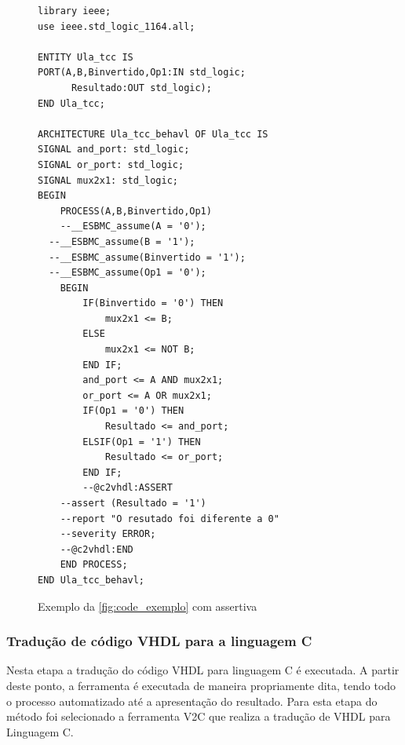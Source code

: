 \begin{figure}[H]
\caption{\label{fig:code_assertivas} Exemplo da \autoref{fig:code_exemplo} com assertiva}
	\begin{center}
    \begin{minipage}{0.7\textwidth}
    \begin{lstlisting}       
library ieee;
use ieee.std_logic_1164.all;

ENTITY Ula_tcc IS
PORT(A,B,Binvertido,Op1:IN std_logic;
	  Resultado:OUT std_logic);
END Ula_tcc;

ARCHITECTURE Ula_tcc_behavl OF Ula_tcc IS
SIGNAL and_port: std_logic;
SIGNAL or_port: std_logic;
SIGNAL mux2x1: std_logic;
BEGIN
	PROCESS(A,B,Binvertido,Op1)
	--__ESBMC_assume(A = '0');
  --__ESBMC_assume(B = '1');
  --__ESBMC_assume(Binvertido = '1');
  --__ESBMC_assume(Op1 = '0');
	BEGIN
		IF(Binvertido = '0') THEN
			mux2x1 <= B;
		ELSE
			mux2x1 <= NOT B;
		END IF;
		and_port <= A AND mux2x1;
		or_port <= A OR mux2x1;
		IF(Op1 = '0') THEN
			Resultado <= and_port;
		ELSIF(Op1 = '1') THEN
			Resultado <= or_port;
		END IF;
	    --@c2vhdl:ASSERT
    --assert (Resultado = '1')
    --report "O resutado foi diferente a 0"
    --severity ERROR;
    --@c2vhdl:END
	END PROCESS;
END Ula_tcc_behavl;
    \end{lstlisting}
    \end{minipage}
	\end{center}
\end{figure}
\subsubsection{Tradução de código VHDL para a linguagem C}
\par
Nesta etapa a tradução do código VHDL para linguagem C é executada. A partir deste ponto, a ferramenta é executada de maneira propriamente dita, tendo todo o processo automatizado até a apresentação do resultado. Para esta etapa do método foi selecionado a ferramenta V2C\cite{albertoV2C} que realiza a tradução de VHDL para Linguagem C.

